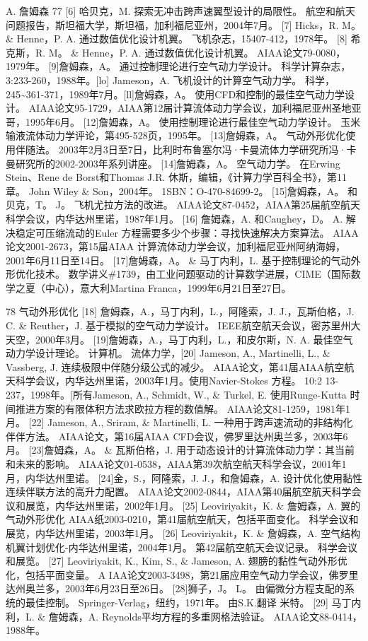 \documentclass[UTF8,11pt,a4paper,openany,fontset=fandol]{ctexbook}
\begin{document}
A. 詹姆森 77 [6] 哈贝克，M. 探索无冲击跨声速翼型设计的局限性。 航空和航天问题报告，斯坦福大学，斯坦福，加利福尼亚州，2004年7月。 [7] Hicks，R. M。 \& Henne，P. A. 通过数值优化设计机翼。 飞机杂志，15407-412，1978年。 [8] 希克斯，R. M。 \& Henne，P. A. 通过数值优化设计机翼。 AIAA论文79-0080，1979年。 [9]詹姆森，A。 通过控制理论进行空气动力学设计。 科学计算杂志，3:233-260，1988年。[lo] Jameson，A. 飞机设计的计算空气动力学。 科学，245\textasciitilde{}361-371，1989年7月。[ll]詹姆森，A。 使用CFD和控制的最佳空气动力学设计。 AIAA论文95-1729，AIAA第12届计算流体动力学会议，加利福尼亚州圣地亚哥，1995年6月。 [12]詹姆森，A。 使用控制理论进行最佳空气动力学设计。 玉米输液流体动力学评论，第495-528页，1995年。 [13]詹姆森，A。 气动外形优化使用伴随法。 2003年2月3日至7日，比利时布鲁塞尔冯·卡曼流体力学研究所冯·卡曼研究所的2002-2003年系列讲座。 [14]詹姆森，A。 空气动力学。 在Erwing Stein、Rene de Borst和Thomas J.R. 休斯，编辑，《计算力学百科全书》，第11章。 John Wiley \& Son，2004年。 1SBN：O-470-84699-2。 [15]詹姆森，A。 和贝克，T。 J。 飞机尤拉方法的改进。 AIAA论文87-0452，AIAA第25届航空航天科学会议，内华达州里诺，1987年1月。 [16] 詹姆森，A. 和Caughey，D。 A. 解决稳定可压缩流动的Euler 方程需要多少个步骤：寻找快速解决方案算法。 AIAA论文2001-2673，第15届AIAA 计算流体动力学会议，加利福尼亚州阿纳海姆，2001年6月11日至14日。 [17]詹姆森，A。 \& 马丁内利，L. 基于控制理论的气动外形优化技术。 数学讲义\#1739，由工业问题驱动的计算数学进展，CIME（国际数学之夏（中心），意大利Martina Franca，1999年6月21日至27日。

78 气动外形优化 [18] 詹姆森，A.，马丁内利，L.，阿隆索，J. J.，瓦斯伯格，J. C. \& Reuther，J. 基于模拟的空气动力学设计。 IEEE航空航天会议，密苏里州大天空，2000年3月。 [19]詹姆森，A.，马丁内利，L.，和皮尔斯，N. A. 最佳空气动力学设计理论。 计算机。 流体力学，[20] Jameson, A., Martinelli, L., \& Vassberg, J. 连续极限中伴随分级公式的减少。 AIAA论文，第41届AIAA航空航天科学会议，内华达州里诺，2003年1月。使用Navier-Stokes 方程。 10:2 13-237，1998年。[所有Jameson, A., Schmidt, W., \& Turkel, E. 使用Runge-Kutta 时间推进方案的有限体积方法求欧拉方程的数值解。 AIAA论文81-1259，1981年1月。 [22] Jameson, A., Sriram, \& Martinelli, L. 一种用于跨声速流动的非结构化伴伴方法。 AIAA论文，第16届AIAA CFD会议，佛罗里达州奥兰多，2003年6月。 [23]詹姆森，A。 \& 瓦斯伯格，J. 用于动态设计的计算流体动力学：其当前和未来的影响。 AIAA论文01-0538，AIAA第39次航空航天科学会议，2001年1月，内华达州里诺。 [24]金，S.，阿隆索，J. J.，和詹姆森，A. 设计优化使用黏性连续伴联方法的高升力配置。 AIAA论文2002-0844，AIAA第40届航空航天科学会议和展览，内华达州里诺，2002年1月。 [25] Leoviriyakit，K. \& 詹姆森，A. 翼的气动外形优化 AIAA纸2003-0210，第41届航空航天，包括平面变化。 科学会议和展览，内华达州里诺，2003年1月。 [26] Leoviriyakit，K. \& 詹姆森，A. 空气结构机翼计划优化-内华达州里诺，2004年1月。 第42届航空航天会议记录。 科学会议和展览。 [27] Leoviriyakit, K., Kim, S., \& Jameson, A. 翅膀的黏性气动外形优化，包括平面变量。 A IAA论文2003-3498，第21届应用空气动力学会议，佛罗里达州奥兰多，2003年6月23日至26日。 [28]狮子，J。 L。 由偏微分方程支配的系统的最佳控制。 Springer-Verlag，纽约，1971年。 由S.K.翻译 米特。 [29] 马丁内利，L. \& 詹姆森，A. Reynolds平均方程的多重网格法验证。 AIAA论文88-0414，1988年。
\end{document}
